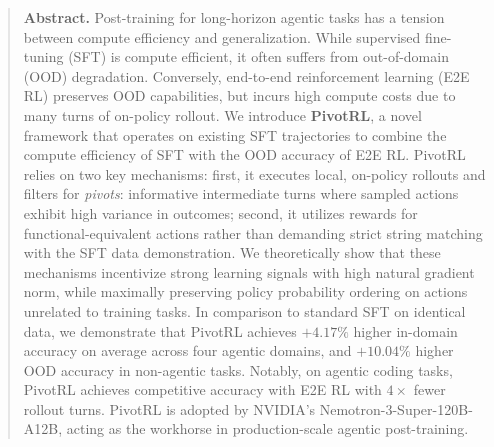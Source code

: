 \begin{abstract}
\large \textbf{Abstract.}
\normalsize
{Post-training for long-horizon agentic tasks has a tension between compute efficiency and generalization.}
While supervised fine-tuning (SFT) is compute efficient, it often suffers from out-of-domain (OOD) degradation. Conversely, end-to-end reinforcement learning (E2E RL) preserves OOD capabilities, but incurs high compute costs due to many turns of on-policy rollout.
We introduce \textbf{PivotRL}, a novel framework that operates on existing SFT trajectories to combine the compute efficiency of SFT with the OOD accuracy of E2E RL. PivotRL relies on two key mechanisms: first, it executes local, on-policy rollouts and filters for \emph{pivots}: informative intermediate turns where sampled actions exhibit high variance in outcomes; second, it utilizes rewards for functional-equivalent actions rather than demanding strict string matching with the SFT data demonstration.
{We theoretically show that these mechanisms incentivize strong  learning signals with high natural gradient norm, while maximally preserving policy probability ordering on actions unrelated to training tasks.}
In comparison to standard SFT on identical data, we demonstrate that
PivotRL achieves $+4.17\%$ higher in-domain accuracy on average across four agentic domains, and $+10.04\%$ higher OOD accuracy in non-agentic tasks.
{Notably, on agentic coding tasks, PivotRL achieves competitive accuracy with E2E RL with $4\times$ fewer rollout turns.}
{PivotRL is adopted by NVIDIA's Nemotron-3-Super-120B-A12B, acting as the workhorse in production-scale agentic post-training.}
\end{abstract}